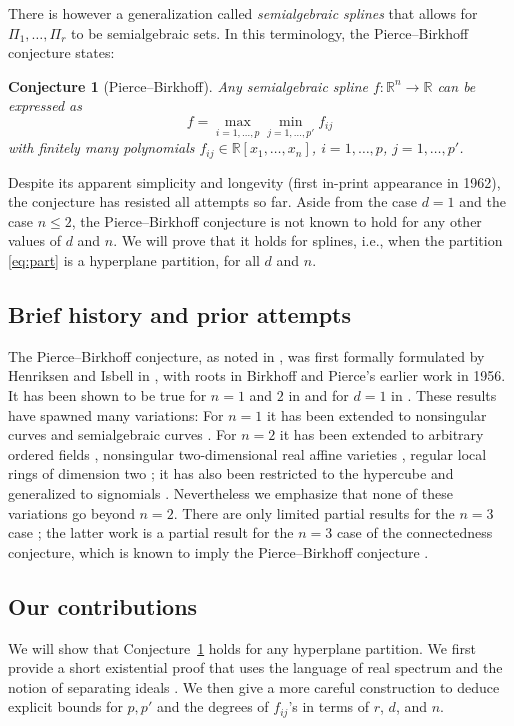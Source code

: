 \documentclass[11pt]{amsart}
\theoremstyle{plain}
\newtheorem{conjecture}[theorem]{Conjecture}
\theoremstyle{definition}
\begin{document}
There is however a generalization called \emph{semialgebraic splines} \cite{dipasquale2020, dipasquale2017, shek} that allows for $\Pi_1,\dots,\Pi_r$ to be  semialgebraic sets. In this terminology, the Pierce--Birkhoff conjecture states:
\begin{conjecture}[Pierce--Birkhoff]\label{conj:PB}
Any semialgebraic spline $f : \mathbb{R}^n \to \mathbb{R}$ can be expressed as
\begin{equation}\label{eq:PB}
f=\max_{i=1,\dots,p}\min_{j=1,\dots,p'} f_{ij}
\end{equation}
with finitely many polynomials $f_{ij} \in \mathbb{R}[x_1,\dots,x_n]$, $i =1,\dots,p$, $j=1,\dots,p'$.
\end{conjecture}
Despite its apparent simplicity and longevity (first in-print appearance in 1962), the conjecture has resisted all attempts so far. Aside from the case $d = 1$ and the case $n \le 2$, the Pierce--Birkhoff conjecture is not known to hold for any other values of $d$ and $n$. We will prove that it holds for splines, i.e., when the partition \eqref{eq:part} is a hyperplane partition, for all  $d$ and $n$.


\subsection*{Brief history and prior attempts} The Pierce--Birkhoff conjecture, as noted in \cite{Madden2011}, was first formally formulated by Henriksen and Isbell in  \cite{HI}, with roots in Birkhoff and Pierce's earlier work \cite{BP} in 1956. It has been shown to be true for $n = 1$ and $2$ in \cite{Mahe1984} and for $d= 1$ in \cite{Ovchinnikov2002}. These results have spawned many variations: For $n  = 1$ it has been extended to nonsingular curves \cite{Madden1989} and semialgebraic curves \cite{PB4}. For $n =2$ it has been extended to arbitrary ordered fields \cite{Delzell89}, nonsingular two-dimensional real affine varieties \cite{Wagner10}, regular local rings of dimension two \cite{Lucas12}; it has also been restricted to the hypercube \cite{Lapenta15} and generalized to signomials \cite{Delzell10}. Nevertheless we emphasize that none of these variations go beyond $n = 2$. There are only limited partial results for the $n = 3$ case \cite{PB3, Lucas15};  the latter work \cite{Lucas15} is a partial result for the $n = 3$ case of the connectedness conjecture, which is known to imply the Pierce--Birkhoff conjecture \cite{Lucas09}.

\subsection*{Our contributions} We will show that Conjecture~\ref{conj:PB} holds for any hyperplane partition. We first provide a short existential proof that uses the language of real spectrum \cite{bochnak2013real} and the notion of separating ideals \cite{Madden1989}.  We then give a more careful construction to deduce explicit bounds for $p, p'$ and the degrees of $f_{ij}$'s in terms of $r$, $d$, and $n$.
\end{document}
